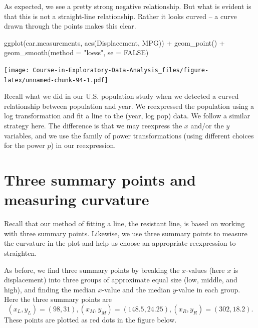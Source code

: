 \documentclass[
]{book}
\newenvironment{Shaded}{\begin{snugshade}}{\end{snugshade}}
\newcommand{\AttributeTok}[1]{\textcolor[rgb]{0.77,0.63,0.00}{#1}}
\newcommand{\ConstantTok}[1]{\textcolor[rgb]{0.00,0.00,0.00}{#1}}
\newcommand{\FunctionTok}[1]{\textcolor[rgb]{0.00,0.00,0.00}{#1}}
\newcommand{\NormalTok}[1]{#1}
\newcommand{\SpecialCharTok}[1]{\textcolor[rgb]{0.00,0.00,0.00}{#1}}
\newcommand{\StringTok}[1]{\textcolor[rgb]{0.31,0.60,0.02}{#1}}
\begin{document}
As expected, we see a pretty strong negative relationship. But what is evident is that this is not a straight-line relationship. Rather it looks curved -- a curve drawn through the points makes this clear.

\begin{Shaded}
\begin{Highlighting}[]
\FunctionTok{ggplot}\NormalTok{(car.measurements,}
       \FunctionTok{aes}\NormalTok{(Displacement, MPG)) }\SpecialCharTok{+}
  \FunctionTok{geom\_point}\NormalTok{() }\SpecialCharTok{+}
  \FunctionTok{geom\_smooth}\NormalTok{(}\AttributeTok{method =} \StringTok{"loess"}\NormalTok{, }\AttributeTok{se =} \ConstantTok{FALSE}\NormalTok{)}
\end{Highlighting}
\end{Shaded}

\texttt{[image: Course-in-Exploratory-Data-Analysis\_files/figure-latex/unnamed-chunk-94-1.pdf]}

Recall what we did in our U.S. population study when we detected a curved relationship between population and year. We reexpressed the population using a log transformation and fit a line to the (year, log pop) data. We follow a similar strategy here. The difference is that we may reexpress the \(x\) and/or the \(y\) variables, and we use the family of power transformations (using different choices for the power \(p\)) in our reexpression.

\hypertarget{three-summary-points-and-measuring-curvature}{%
\section{Three summary points and measuring curvature}\label{three-summary-points-and-measuring-curvature}}

Recall that our method of fitting a line, the resistant line, is based on working with three summary points. Likewise, we use three summary points to measure the curvature in the plot and help us choose an appropriate reexpression to straighten.

As before, we find three summary points by breaking the \(x\)-values (here \(x\) is displacement) into three groups of approximate equal size (low, middle, and high), and finding the median \(x\)-value and the median \(y\)-value in each group. Here the three summary points are
\[
(x_L, y_L) = (98, 31), (x_M, y_M) = (148.5, 24.25), (x_R, y_R) = (302, 18.2).  
\]
These points are plotted as red dots in the figure below.
\end{document}
